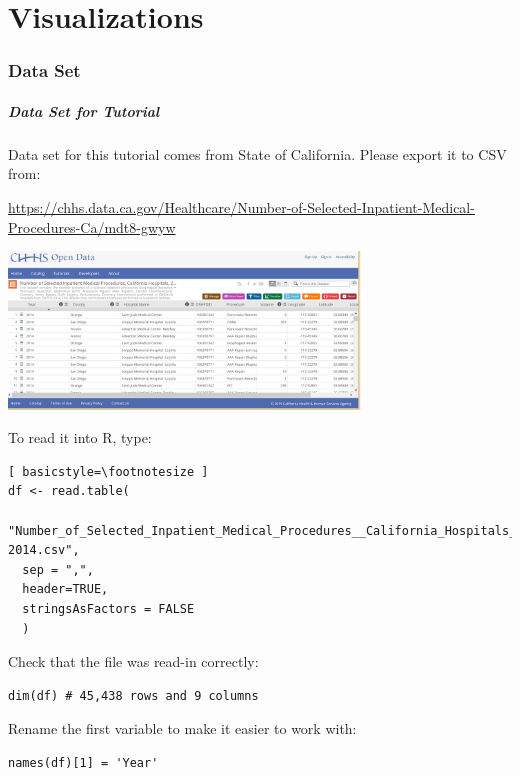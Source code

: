 \part{Visualizations}

\section{Data Set}
\begin{frame}
\frametitle{Data Set for Tutorial}
	Data set for this tutorial comes from State of California.  Please export it to CSV from: \\
	\vspace{5pt}

	\noindent \url{https://chhs.data.ca.gov/Healthcare/Number-of-Selected-Inpatient-Medical-Procedures-Ca/mdt8-gwyw}

    \begin{center}
     \includegraphics[width=0.7\textwidth]{images/data.png}
    \end{center}  

\newpage   
	\noindent To read it into R, type:
  		\begin{lstlisting}[ basicstyle=\footnotesize ]
df <- read.table(
  "Number_of_Selected_Inpatient_Medical_Procedures__California_Hospitals__2005-2014.csv",
  sep = ",",
  header=TRUE,
  stringsAsFactors = FALSE
  )
    \end{lstlisting}

Check that the file was read-in correctly:
\begin{lstlisting}
dim(df) # 45,438 rows and 9 columns
\end{lstlisting}

Rename the first variable to make it easier to work with:
\begin{lstlisting}
names(df)[1] = 'Year'
		\end{lstlisting}

\end{frame}

